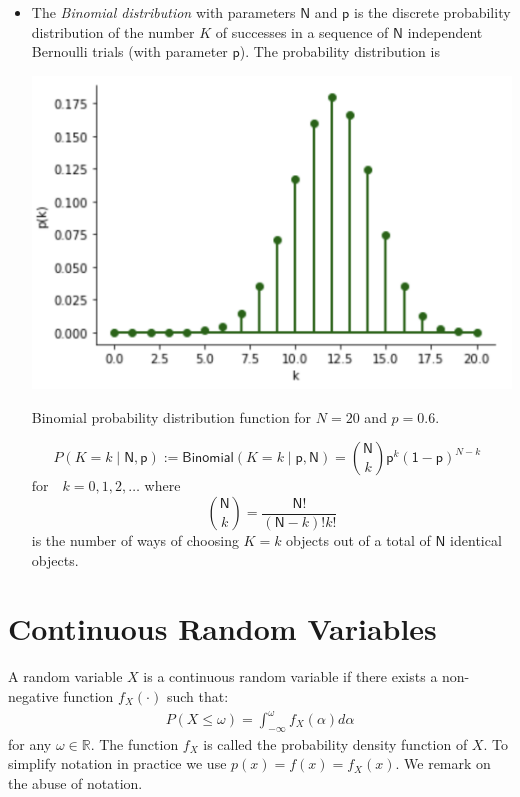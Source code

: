 \documentclass{tufte-handout}
\begin{document}
\begin{itemize}
\begin{marginfigure}
\caption{Binomial probability distribution function for $N=20$ and $p=0.5$.
}
\end{marginfigure}

\item The \textit{Binomial distribution} with parameters $\mathsf N$ and $\mathsf p$ is the discrete probability distribution of the number $K$ of successes in a sequence of $\mathsf N$ independent Bernoulli trials (with parameter $\mathsf p$). The probability distribution is
\begin{marginfigure}
\centering
\includegraphics{fig/binomial2.png}

\caption{Binomial probability distribution function for $N=20$ and $p=0.6$.
}
\end{marginfigure}

\begin{equation*}
P(K=k\mid {\mathsf N},\mathsf p) := \mathsf{Binomial}(K=k\mid \mathsf p,\mathsf N)  = {{\mathsf N}\choose k} \mathsf p^k\mathsf{(1- p)}^{{N}-k} \,\,\,\, 
\end{equation*}
$ \text{for } \,\,\,\, k = 0,1,2,\dots$ where $${{\mathsf N}\choose k} = \frac{{\mathsf N}!}{({\mathsf N}-k)!k!}$$ is the number of ways of choosing $K=k$ objects out of a total of $ \mathsf N$ identical objects.
\end{itemize}

\section{Continuous Random Variables }

A random variable $X$ is a continuous random variable if there exists a non-negative function $f_X(\cdot)$ such that:
\begin{align*}
P(X\leq \omega) = \int_{-\infty}^\omega f_X(\alpha)d\alpha
\end{align*}
for any $\omega\in \mathbb R$. The function $f_X$ is called the probability density function of $X$. To simplify notation in practice we use $p(x) = f(x) = f_X(x)$. We remark on the abuse of notation.
\end{document}
